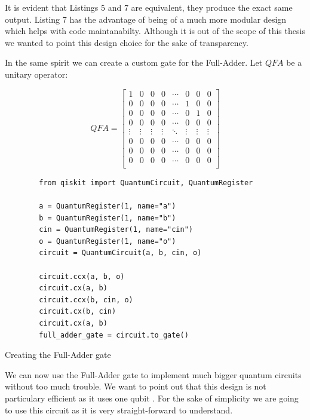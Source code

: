It is evident that Listings 5 and 7 are equivalent, they produce the exact same output. Listing 7 has the advantage of being
of a much more modular design which helps with code maintanabilty. Although it is out of the scope of this thesis we wanted
to point this design choice for the sake of transparency.

In the same spirit we can create a custom gate for the Full-Adder. Let $QFA$ be a unitary operator:

\begin{equation}
    QFA = \begin{bmatrix}
        1 & 0 & 0 & 0 & \cdots & 0 & 0 & 0  \\
         0 & 0 & 0 & 0 & \cdots & 1 & 0 & 0  \\
         0 & 0 & 0 & 0 & \cdots & 0 & 1 & 0  \\
         0 & 0 & 0 & 0 & \cdots & 0 & 0 & 0  \\
         \vdots & \vdots & \vdots & \vdots & \ddots & \vdots & \vdots & \vdots \\
         0 & 0 & 0 & 0 & \cdots & 0 & 0 & 0  \\
         0 & 0 & 0 & 0 & \cdots & 0 & 0 & 0  \\
         0 & 0 & 0 & 0 & \cdots & 0 & 0 & 0  \\
         \end{bmatrix}
\end{equation}

\begin{listing}[ht]
    \centering
    \begin{verbatim}
        from qiskit import QuantumCircuit, QuantumRegister
    
        a = QuantumRegister(1, name="a")
        b = QuantumRegister(1, name="b")
        cin = QuantumRegister(1, name="cin")
        o = QuantumRegister(1, name="o")
        circuit = QuantumCircuit(a, b, cin, o)

        circuit.ccx(a, b, o)
        circuit.cx(a, b)
        circuit.ccx(b, cin, o)
        circuit.cx(b, cin)
        circuit.cx(a, b)
        full_adder_gate = circuit.to_gate()
    \end{verbatim}
    \caption{Creating the Full-Adder gate}
\end{listing}
\newpage

We can now use the Full-Adder gate to implement much bigger quantum circuits without too much trouble. We want to point out that
this design is not particulary efficient as it uses one  qubit \cite{Feynman1984}. For the sake of simplicity
we are going to use this circuit as it is very straight-forward to understand.

